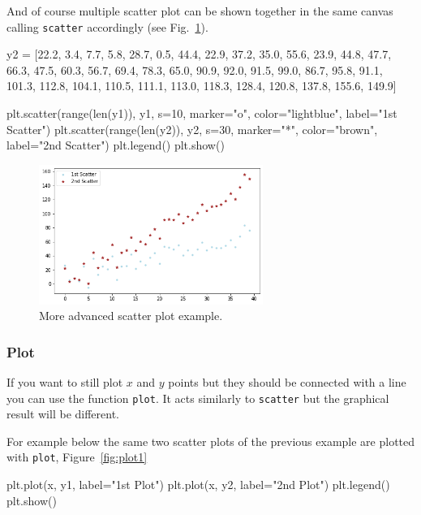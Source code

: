 And of course multiple scatter plot can be shown together in the same canvas calling \texttt{scatter} accordingly (see Fig.~\ref{fig:scatter2}).

\begin{ipython}
y2 = [22.2, 3.4, 7.7, 5.8, 28.7, 0.5, 44.4, 22.9, 37.2, 35.0, 55.6,
      23.9, 44.8, 47.7, 66.3, 47.5, 60.3, 56.7, 69.4, 78.3, 65.0,
      90.9, 92.0, 91.5, 99.0, 86.7, 95.8, 91.1, 101.3, 112.8,
      104.1, 110.5, 111.1, 113.0, 118.3, 128.4, 120.8, 137.8, 155.6, 149.9]

plt.scatter(range(len(y1)), y1, s=10, marker="o",
color="lightblue", label="1st Scatter")
plt.scatter(range(len(y2)), y2, s=30, marker="*",
color="brown", label="2nd Scatter")
plt.legend()
plt.show()
\end{ipython}

\begin{figure}[htb]
	\centering
	\includegraphics[width=0.65\textwidth]{figures/scatter2}
	\caption{More advanced scatter plot example.}
	\label{fig:scatter2}
\end{figure}

\subsubsection{Plot}\label{plot}

If you want to still plot $x$ and $y$ points but they should be connected with a line you can use the function \texttt{plot}. It acts similarly to \texttt{scatter} but the graphical result will be different.

For example below the same two scatter plots of the previous example are plotted with \texttt{plot}, Figure~\ref{fig:plot1}

\begin{ipython}
plt.plot(x, y1, label="1st Plot")
plt.plot(x, y2, label="2nd Plot")
plt.legend()
plt.show()
\end{ipython}


